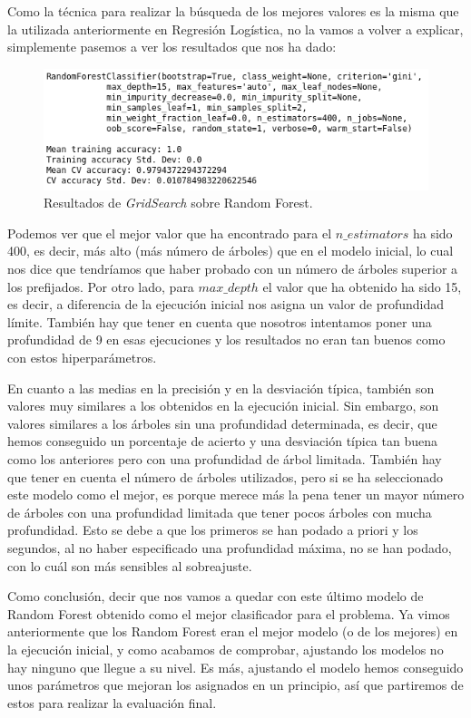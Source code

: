 \documentclass[11pt,a4paper]{article}
\begin{document}
Como la técnica para realizar la búsqueda de los mejores valores es la misma que la utilizada anteriormente en Regresión Logística, no la
vamos a volver a explicar, simplemente pasemos a ver los resultados que nos ha dado:

\begin{figure}[H]
    \centering
    \includegraphics[scale=0.6]{img/gs-rf.png}
    \caption{Resultados de \textit{GridSearch} sobre Random Forest.}
    \label{fig:gs-rf}
\end{figure}

Podemos ver que el mejor valor que ha encontrado para el $n\_estimators$ ha sido 400, es decir, más alto (más número de árboles) que en el
modelo inicial, lo cual nos dice que tendríamos que haber probado con un número de árboles superior a  los prefijados. Por otro lado, para
$max\_depth$ el valor que ha obtenido ha sido 15, es decir, a diferencia de la ejecución inicial nos asigna un valor de profundidad límite.
También hay que tener en cuenta que nosotros intentamos poner una profundidad de 9 en esas ejecuciones y los resultados no eran tan buenos
como con estos hiperparámetros.

En cuanto a las medias en la precisión y en la desviación típica, también son valores muy similares a los obtenidos en la ejecución
inicial. Sin embargo, son valores similares a los árboles sin una profundidad determinada, es decir, que hemos conseguido un porcentaje de
acierto y una desviación típica tan buena como los anteriores pero con una profundidad de árbol limitada. También hay que tener en cuenta
el número de árboles utilizados, pero si se ha seleccionado este modelo como el mejor, es porque merece más la pena tener un mayor número
de árboles con una profundidad limitada que tener pocos árboles con mucha profundidad. Esto se debe a que los primeros se han podado a
priori y los segundos, al no haber especificado una profundidad máxima, no se han podado, con lo cuál son más sensibles al sobreajuste.

Como conclusión, decir que nos vamos a quedar con este último modelo de Random Forest obtenido como el mejor clasificador para el problema.
Ya vimos anteriormente que los Random Forest eran el mejor modelo (o de los mejores) en la ejecución inicial, y como acabamos de comprobar,
ajustando los modelos no hay ninguno que llegue a su nivel. Es más, ajustando el modelo hemos conseguido unos parámetros que mejoran los
asignados en un principio, así que partiremos de estos para realizar la evaluación final.
\end{document}
